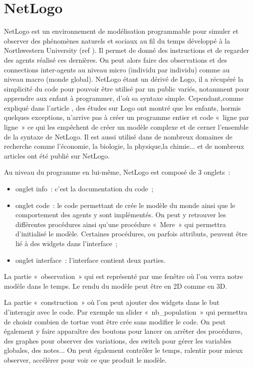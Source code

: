 \section{NetLogo}
\label{NetLogo}

NetLogo est un environnement de modélisation programmable pour simuler et observer des phénomènes naturels et sociaux au fil du temps développé à la Northwestern University (ref \cite{netlogo}). Il permet de donné des instructions et de regarder des agents réalisé ces dernières. On peut alors faire des observations et des connections inter-agents au niveau micro (individu par individu) comme au niveau macro (monde global).
NetLogo étant un dérivé de Logo, il a récupéré la simplicité du code pour pouvoir être utilisé par un public variés, notamment pour apprendre aux enfant à programmer, d'où sa syntaxe simple. Cependant,comme expliqué dans l'article \cite{Logo}, des études sur Logo ont montré que les enfants, hormis quelques exceptions, n'arrive pas à créer un programme entier et code «~ligne par ligne~» ce qui les empêchent de créer un modèle complexe et de cerner l'ensemble de la syntaxe de NetLogo.
Il est aussi utilisé dans de nombreux domaines de recherche comme l'économie, la biologie, la physique,la chimie... et de nombreux articles ont été publié sur NetLogo.

Au niveau du programme en lui-même, NetLogo est composé de 3 onglets~: 
\begin{itemize}
	\item onglet info~: c'est la documentation du code~;
	\item onglet code~: le code permettant de crée le modèle du monde ainsi que le comportement des agents y sont implémentés. On peut y retrouver les différentes procédures ainsi qu'une procédure «~Mere~» qui permettra d'initialisé le modèle. Certaines procédures, ou parfois attributs, peuvent être lié à des widgets dans l'interface~;
	\item onglet interface~: l'interface contient deux parties.
\end{itemize}

La partie «~observation~» qui est représenté par une fenêtre où l'on verra notre modèle dans le temps. Le rendu du modèle peut être en 2D comme en 3D.

La partie «~construction~» où l'on peut ajouter des widgets dans le but d’interagir avec le code. Par exemple un slider «~nb\_population~» qui permettra de choisir combien de tortue vont être crée sans modifier le code. On peut également y faire apparaître des boutons pour lancer on arrêter des procédures, des graphes pour observer des variations, des switch pour gérer les variables globales, des notes... On peut également contrôler le temps, ralentir pour mieux observer, accélérer pour voir ce que produit le modèle.

